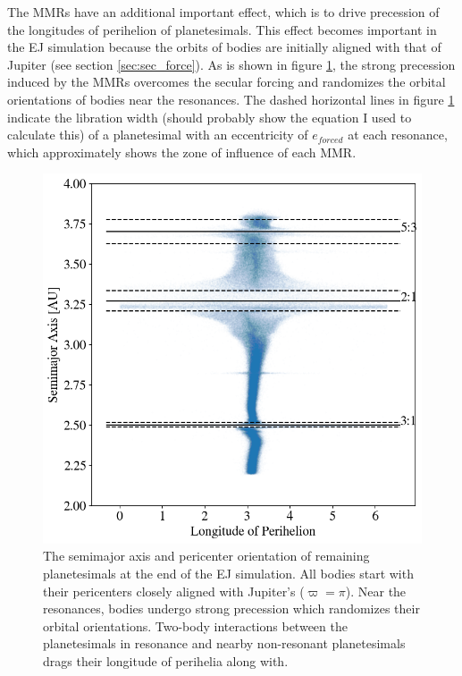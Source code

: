\documentclass[onecolumn]{aastex63}
\begin{document}
The MMRs have an additional important effect, which is to drive precession of the longitudes of perihelion of planetesimals. 
This effect becomes important in the EJ simulation because the orbits of bodies are initially aligned with that of Jupiter 
(see section \ref{sec:sec_force}). As is shown in figure \ref{fig:long_ph}, the strong precession induced by the MMRs overcomes the 
secular forcing and randomizes the orbital orientations of bodies near the resonances. The dashed horizontal lines in figure 
\ref{fig:long_ph} indicate the libration width (should probably show the equation I used to calculate this) of a planetesimal with an 
eccentricity of $e_{forced}$ at each resonance, which approximately shows the zone of influence of each MMR.

\begin{figure}
    \begin{center}
    \includegraphics[width=0.4\columnwidth]{figures/long_ph.png}
    \caption{The semimajor axis and pericenter orientation of remaining planetesimals at the end of the EJ simulation. All bodies start with their 
    pericenters closely aligned with Jupiter's ($\varpi = \pi$). Near the resonances, bodies undergo strong precession which randomizes their 
    orbital orientations. Two-body interactions between the planetesimals in resonance and nearby non-resonant planetesimals drags their 
    longitude of perihelia along with.\label{fig:long_ph}}
    \end{center}
\end{figure}
\end{document}
